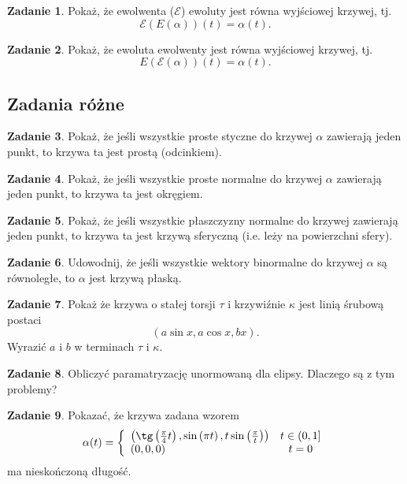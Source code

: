 \documentclass[a4paper,11pt]{article}
\theoremstyle{definition}\newtheorem{exercise}{Zadanie}
\theoremstyle{definition}\newtheorem{remark}{Uwaga}
\begin{document}
\begin{exercise}
Pokaż, że ewolwenta ($\mathcal{E}$) ewoluty jest równa wyjściowej krzywej, tj.
\[\mathcal{E}(E(\alpha))(t)=\alpha(t).\] 
\end{exercise}

\begin{exercise}
Pokaż, że ewoluta ewolwenty jest równa wyjściowej krzywej, tj.
\[E(\mathcal{E}(\alpha))(t)=\alpha(t).\] 
\end{exercise}

\subsection{Zadania r\'ożne}

\begin{exercise}
Pokaż, że jeśli wszystkie proste styczne do krzywej $\alpha$ zawierają jeden 
punkt, to krzywa ta jest prostą (odcinkiem).
\end{exercise}

\begin{exercise}
Pokaż, że jeśli wszystkie proste normalne do krzywej $\alpha$ zawierają jeden 
punkt, to krzywa ta jest okręgiem.
\end{exercise}

\begin{exercise}
 Pokaż, że jeśli wszystkie płaszczyzny normalne do krzywej zawierają jeden 
punkt, to krzywa ta jest krzywą sferyczną (i.e. leży na powierzchni sfery).
\end{exercise}

\begin{exercise}
Udowodnij, że jeśli wszystkie wektory binormalne do krzywej $\alpha$ są 
równoległe, to $\alpha$ jest krzywą płaską.
\end{exercise}

\begin{exercise} 
Pokaż że krzywa o stałej torsji $\tau$ i krzywiźnie $\kappa$ jest linią śrubową 
postaci
\[(a \sin{x},a\cos{x},b x).\]
Wyrazić $a$ i $b$ w terminach $\tau$ i $\kappa$.
\end{exercise}

\begin{exercise}
Obliczyć paramatryzację unormowaną dla elipsy. Dlaczego są z tym problemy?
\end{exercise}

\begin{exercise}
Pokazać, że krzywa zadana wzorem
\[\alpha(t)=\left\{
\begin{array}{lc}
\left(\tg\left(\frac{\pi}{4}t\right),\sin\left(\pi t\right),t 
\sin\left(\frac{\pi} {t}\right)\right) & t\in (0,1]\\
(0,0,0) & t=0
\end{array}\right.\]
ma nieskończoną długość.

\end{exercise}
\end{document}
